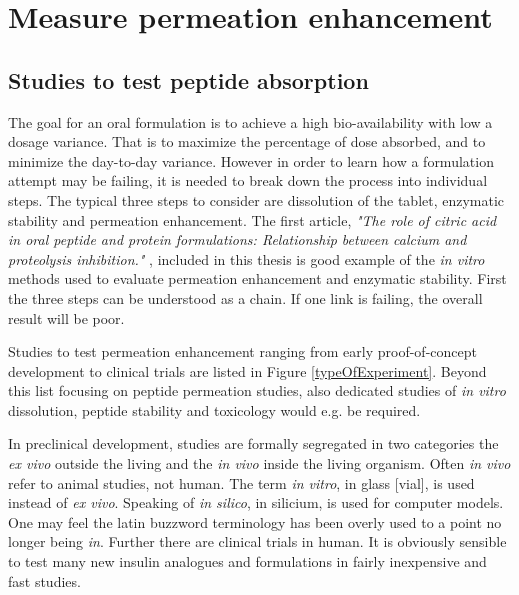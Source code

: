\chapter{Measure permeation enhancement}


\section{Studies to test peptide absorption}
The goal for an oral formulation is to achieve a high bio-availability with low a dosage variance. That is to maximize the percentage of dose absorbed, and to minimize the day-to-day variance. However in order to learn how a formulation attempt may be failing, it is needed to break down the process into individual steps. The typical three steps to consider are dissolution of the tablet, enzymatic stability and permeation enhancement. The first article, \textit{"The role of citric acid in oral peptide and protein formulations: Relationship between calcium and proteolysis inhibition."} \cite{welling2014citric}, included in this thesis is good example of the \textit{in vitro} methods used to evaluate permeation enhancement and enzymatic stability. First the three steps can be understood as a chain. If one link is failing, the overall result will be poor.

Studies to test permeation enhancement ranging from early proof-of-concept development to clinical trials are listed in Figure \ref{typeOfExperiment}. Beyond this list focusing on peptide permeation studies, also dedicated studies of \textit{in vitro} dissolution, peptide stability and toxicology would e.g. be required.

In preclinical development, studies are formally segregated in two categories the \textit{ex vivo} outside the living and the \textit{in vivo} inside the living organism. Often \textit{in vivo} refer to animal studies, not human. The term \textit{in vitro}, in glass [vial], is used instead of \textit{ex vivo}. Speaking of \textit{in silico}, in silicium, is used for computer models. One may feel the latin buzzword terminology has been overly used to a point no longer being \textit{in}. Further there are clinical trials in human. It is obviously sensible to test many new insulin analogues and formulations in fairly inexpensive and fast studies.

